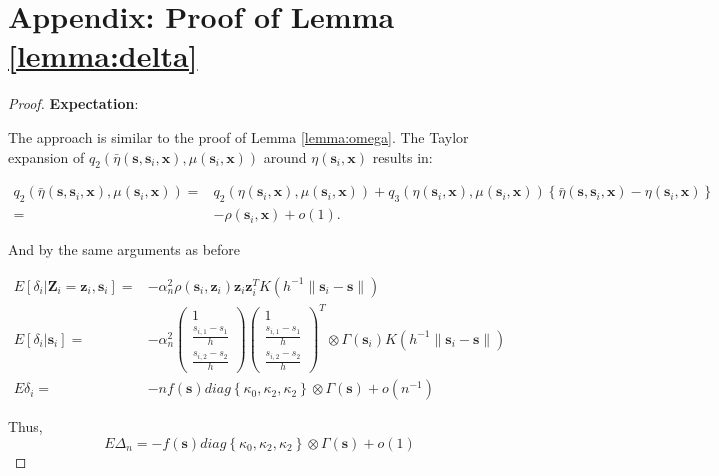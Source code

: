 \documentclass[authoryear,review, 12pt]{elsarticle}
\begin{document}
\section*{Appendix: Proof of Lemma \ref{lemma:delta}}
\begin{proof}
\textbf{Expectation}:

The approach is similar to the proof of Lemma \ref{lemma:omega}.
The Taylor expansion of $q_{2}\left(\bar{\eta}\left(\bm{s},\bm{s}_{i},\bm{x}\right),\mu\left(\bm{s}_{i},\bm{x}\right)\right)$
around $\eta\left(\bm{s}_{i},\bm{x}\right)$ results in:

\begin{align*}
q_{2}\left(\bar{\eta}\left(\bm{s},\bm{s}_{i},\bm{x}\right),\mu\left(\bm{s}_{i},\bm{x}\right)\right)= & q_{2}\left(\eta\left(\bm{s}_{i},\bm{x}\right),\mu\left(\bm{s}_{i},\bm{x}\right)\right)+q_{3}\left(\eta\left(\bm{s}_{i},\bm{x}\right),\mu\left(\bm{s}_{i},\bm{x}\right)\right)\left\{ \bar{\eta}\left(\bm{s},\bm{s}_{i},\bm{x}\right)-\eta\left(\bm{s}_{i},\bm{x}\right)\right\} \\
= & -\rho\left(\bm{s}_{i},\bm{x}\right)+o\left(1\right).
\end{align*}


And by the same arguments as before

\begin{align*}
E\left[\delta_{i}|\bm{Z}_{i}=\bm{z}_{i},\bm{s}_{i}\right]= & -\alpha_{n}^{2}\rho\left(\bm{s}_{i},\bm{z}_{i}\right)\bm{z}_{i}\bm{z}_{i}^{T}K\left(h^{-1}\|\bm{s}_{i}-\bm{s}\|\right)\\
E\left[\delta_{i}|\bm{s}_{i}\right]= & -\alpha_{n}^{2}\left(\begin{array}{c}
1\\
\frac{s_{i,1}-s_{1}}{h}\\
\frac{s_{i,2}-s_{2}}{h}
\end{array}\right)\left(\begin{array}{c}
1\\
\frac{s_{i,1}-s_{1}}{h}\\
\frac{s_{i,2}-s_{2}}{h}
\end{array}\right)^{T}\otimes\Gamma\left(\bm{s}_{i}\right)K\left(h^{-1}\|\bm{s}_{i}-\bm{s}\|\right)\\
E\delta_{i}= & -nf\left(\bm{s}\right)diag\left\{ \kappa_{0},\kappa_{2},\kappa_{2}\right\} \otimes\Gamma\left(\bm{s}\right)+o\left(n^{-1}\right)
\end{align*}


Thus, 
\[
E\Delta_{n}=-f\left(\bm{s}\right)diag\left\{ \kappa_{0},\kappa_{2},\kappa_{2}\right\} \otimes\Gamma\left(\bm{s}\right)+o\left(1\right)
\]



\end{proof}
\end{document}
